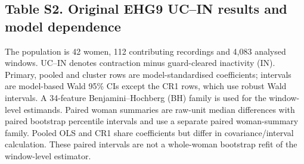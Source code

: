 \documentclass[10pt]{article}
\begin{document}
\clearpage
\begin{landscape}
\section*{Table S2. Original EHG9 UC--IN results and model dependence}\label{tab:s2_model_dependence}
The population is 42 women, 112 contributing recordings and 4,083 analysed windows. UC--IN denotes contraction minus guard-cleared inactivity (IN). Primary, pooled and cluster rows are model-standardised coefficients; intervals are model-based Wald 95\% CIs except the CR1 rows, which use robust Wald intervals. A 34-feature Benjamini--Hochberg (BH) family is used for the window-level estimands. Paired woman summaries are raw-unit median differences with paired bootstrap percentile intervals and use a separate paired woman-summary family. Pooled OLS and CR1 share coefficients but differ in covariance/interval calculation. These paired intervals are not a whole-woman bootstrap refit of the window-level estimator.

\end{landscape}
\end{document}
